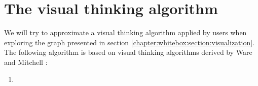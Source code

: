 \section{The visual thinking algorithm}\label{chapter:whitebox:section:algorithm}

We will try to approximate a visual thinking algorithm applied by users when exploring the graph presented in section \ref{chapter:whitebox:section:visualization}. The following algorithm is based on visual thinking algorithms derived by Ware and Mitchell \cite{ware:2004}:

\begin{enumerate}
	\item 
\end{enumerate}


